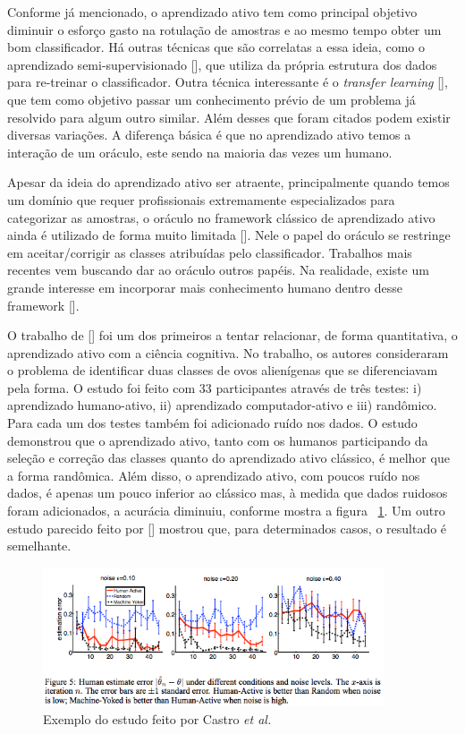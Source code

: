 Conforme já mencionado, o aprendizado ativo tem como principal objetivo diminuir o esforço gasto na rotulação de amostras e ao mesmo tempo obter um bom classificador. Há outras técnicas que são correlatas a essa ideia, como o aprendizado semi-supervisionado [\cite{zhu2006semi}], que utiliza da própria estrutura dos dados para re-treinar o classificador. Outra técnica interessante é o \emph{transfer learning} [\cite{rodrigues2018evaluation}], que tem como objetivo passar um conhecimento prévio de um problema já resolvido para algum outro similar. Além desses que foram citados podem existir diversas variações. A diferença básica é que no aprendizado ativo temos a interação de um oráculo, este sendo na maioria das vezes um humano. 


Apesar da ideia do aprendizado ativo ser atraente, principalmente quando temos um domínio que requer profissionais extremamente especializados para categorizar as amostras, o oráculo no framework clássico de aprendizado ativo ainda é utilizado de forma muito limitada [\cite{seifert2010user}]. Nele o papel do oráculo se restringe em aceitar/corrigir as classes atribuídas pelo classificador. Trabalhos mais recentes vem buscando dar ao oráculo outros papéis. Na realidade, existe um grande interesse em incorporar mais conhecimento humano dentro desse framework [\cite{settles2014active}]. 

O trabalho de [\cite{castro2009human}] foi um dos primeiros a tentar relacionar, de forma quantitativa, o aprendizado ativo com a ciência cognitiva. No trabalho, os autores consideraram o problema de identificar duas classes de ovos alienígenas que se diferenciavam pela forma. O estudo foi feito com 33 participantes através de três testes: i) aprendizado humano-ativo, ii) aprendizado computador-ativo e iii) randômico. Para cada um dos testes também foi adicionado ruído nos dados. O estudo demonstrou que o aprendizado ativo, tanto com os humanos participando da seleção e correção das classes quanto do aprendizado ativo clássico, é melhor que a forma randômica.  Além disso, o aprendizado ativo, com poucos ruído nos dados, é apenas um pouco inferior ao clássico mas, à medida que dados ruidosos foram adicionados, a acurácia diminuiu, conforme mostra a figura ~\ref{fig:human_active_learning_graph}. Um outro estudo parecido feito por [\cite{markant2014better}] mostrou que, para determinados casos, o resultado é semelhante.

\begin{figure}
  \centering
  \includegraphics[width=0.9\textwidth]{figures/human_active_learning_graph.png}
  \caption{Exemplo do estudo feito por Castro \emph{et al.}}
  \label{fig:human_active_learning_graph}
\end{figure}


